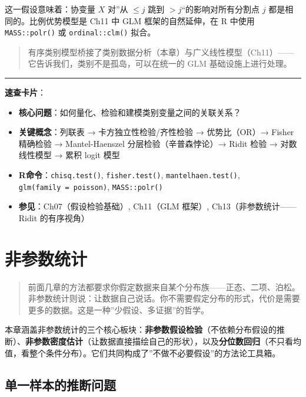 \documentclass[
]{book}
\providecommand{\tightlist}{%
  \setlength{\itemsep}{0pt}\setlength{\parskip}{0pt}}
\begin{document}
这一假设意味着：协变量 \(X\) 对''从 \(\leq j\) 跳到 \(>j\)``的影响对所有分割点 \(j\) 都是相同的。比例优势模型是 Ch11 中 GLM 框架的自然延伸，在 R 中使用 \texttt{MASS::polr()} 或 \texttt{ordinal::clm()} 拟合。

\begin{quote}
有序类别模型桥接了类别数据分析（本章）与广义线性模型（Ch11）------它告诉我们，类别不是孤岛，可以在统一的 GLM 基础设施上进行处理。
\end{quote}

\begin{center}\rule{0.5\linewidth}{0.5pt}\end{center}

\textbf{速查卡片}：

\begin{itemize}
\tightlist
\item
  \textbf{核心问题}：如何量化、检验和建模类别变量之间的关联关系？
\item
  \textbf{关键概念}：列联表 → 卡方独立性检验/齐性检验 → 优势比（OR）→ Fisher 精确检验 → Mantel-Haenszel 分层检验（辛普森悖论）→ Ridit 检验 → 对数线性模型 → 累积 logit 模型
\item
  \textbf{R命令}：\texttt{chisq.test()}, \texttt{fisher.test()}, \texttt{mantelhaen.test()}, \texttt{glm(family\ =\ poisson)}, \texttt{MASS::polr()}
\item
  \textbf{参见}：Ch07（假设检验基础）, Ch11（GLM 框架）, Ch13（非参数统计------Ridit 的有序视角）
\end{itemize}

\chapter{非参数统计}\label{ux975eux53c2ux6570ux7edfux8ba1}

\begin{quote}
前面几章的方法都要求你假定数据来自某个分布族------正态、二项、泊松。非参数统计则说：让数据自己说话。你不需要假定分布的形式，代价是需要更多的数据。这是一种''少假设、多证据''的哲学。
\end{quote}

本章涵盖非参数统计的三个核心板块：\textbf{非参数假设检验}（不依赖分布假设的推断）、\textbf{非参数密度估计}（让数据直接描绘自己的形状），以及\textbf{分位数回归}（不只看均值，看整个条件分布）。它们共同构成了''不做不必要假设''的方法论工具箱。

\section{单一样本的推断问题}\label{ux5355ux4e00ux6837ux672cux7684ux63a8ux65adux95eeux9898}
\end{document}
